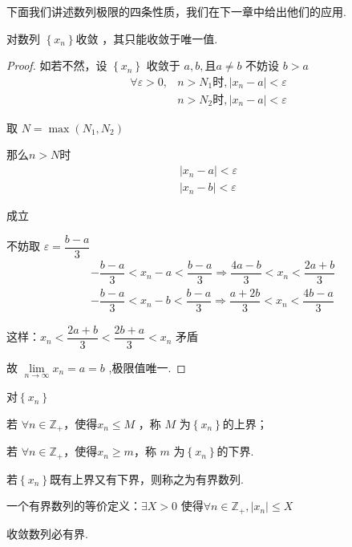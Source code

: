 下面我们讲述数列极限的四条性质，我们在下一章中给出他们的应用.
\begin{proposition}
	对数列 $\left\{x_n\right\}$收敛 ，其只能收敛于唯一值.
\end{proposition}

\begin{proof}
	如若不然，设 $\left\{x_n\right\}$ 收敛于 $a,  b,\textbf{且} a \neq b$ 不妨设 $b>a $
	\begin{align*}
		\forall \varepsilon>0 ,& n>N_1 \textbf{时} ,\left|x_n-a\right|<\varepsilon\\
		&n>N_2 \textbf{时} ,\left|x_n-a\right|<\varepsilon
	\end{align*}
	
	
	
	取 $N=\max \left(N_1, N_2\right)$
	
	那么$n>N$时
	\begin{align*}
		\left|x_n-a\right|<\varepsilon\\ \left|x_n-b\right|<\varepsilon
	\end{align*}
	
	成立
	
	不妨取 $\varepsilon=\dfrac{b-a}{3}$
	\begin{align*}
		&-\dfrac{b-a}{3}<x_n-a<\dfrac{b-a}{3} \Rightarrow \dfrac{4 a-b}{3}<x_n<\dfrac{2 a+b}{3}\\
		&-\dfrac{b-a}{3}<x_n-b<\dfrac{b-a}{3} \Rightarrow \dfrac{a+2 b}{3}<x_n<\dfrac{4 b-a}{3}
	\end{align*}
	
	这样：$x_n<\dfrac{2 a+b}{3}<\dfrac{2 b+a}{3}<x_n$ 矛盾
	
	故 $\lim\limits _{n \rightarrow \infty} x_n=a=b$ ,极限值唯一.
\end{proof}

\begin{definition}
	对$\left\{x_n\right\}$
	
	若 $\forall n \in \mathbb{Z}_{+}$，使得$x_n \leqslant M$ ，称 $M$ 为$\left\{x_n\right\}$的上界；
	
	若 $\forall n \in \mathbb{Z}_{+}$，使得$x_n \geqslant m$，称 $m$ 为$\left\{x_n\right\}$的下界.
	
	若$\left\{x_n\right\}$既有上界又有下界，则称之为有界数列.
	
	一个有界数列的等价定义：$\exists X>0$ 使得$\forall n \in \mathbb{Z_+}, \left|x_n\right| \leqslant X$
\end{definition}
\begin{proposition}
	收敛数列必有界.
\end{proposition}

